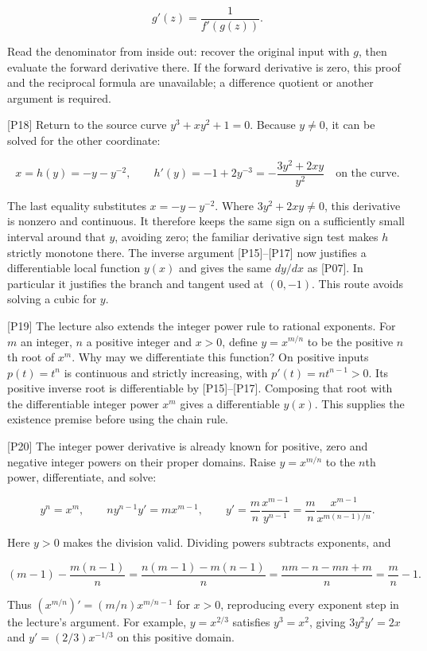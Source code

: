 \documentclass[
  11pt,
]{article}
\providecommand{\gt}{>}
\begin{document}
\[
g'(z)=\frac{1}{f'(g(z))}.
\]

Read the denominator from inside out: recover the original input with
\(g\), then evaluate the forward derivative there. If the forward
derivative is zero, this proof and the reciprocal formula are
unavailable; a difference quotient or another argument is required.

{[}P18{]} Return to the source curve \(y^3+xy^2+1=0\). Because
\(y\ne0\), it can be solved for the other coordinate:

\[
x=h(y)=-y-y^{-2},\qquad h'(y)=-1+2y^{-3}
       =-\frac{3y^2+2xy}{y^2}\quad\text{on the curve}.
\]

The last equality substitutes \(x=-y-y^{-2}\). Where \(3y^2+2xy\ne0\),
this derivative is nonzero and continuous. It therefore keeps the same
sign on a sufficiently small interval around that \(y\), avoiding zero;
the familiar derivative sign test makes \(h\) strictly monotone there.
The inverse argument {[}P15{]}--{[}P17{]} now justifies a differentiable
local function \(y(x)\) and gives the same \(dy/dx\) as {[}P07{]}. In
particular it justifies the branch and tangent used at \((0,-1)\). This
route avoids solving a cubic for \(y\).

{[}P19{]} The lecture also extends the integer power rule to rational
exponents. For \(m\) an integer, \(n\) a positive integer and
\(x\gt 0\), define \(y=x^{m/n}\) to be the positive \(n\)th root of
\(x^m\). Why may we differentiate this function? On positive inputs
\(p(t)=t^n\) is continuous and strictly increasing, with
\(p'(t)=nt^{n-1}\gt 0\). Its positive inverse root is differentiable by
{[}P15{]}--{[}P17{]}. Composing that root with the differentiable
integer power \(x^m\) gives a differentiable \(y(x)\). This supplies the
existence premise before using the chain rule.

{[}P20{]} The integer power derivative is already known for positive,
zero and negative integer powers on their proper domains. Raise
\(y=x^{m/n}\) to the \(n\)th power, differentiate, and solve:

\[
y^n=x^m,\qquad ny^{n-1}y'=mx^{m-1},\qquad
y'=\frac{m}{n}\frac{x^{m-1}}{y^{n-1}}
   =\frac{m}{n}\frac{x^{m-1}}{x^{m(n-1)/n}}.
\]

Here \(y\gt 0\) makes the division valid. Dividing powers subtracts
exponents, and

\[
(m-1)-\frac{m(n-1)}n
=\frac{n(m-1)-m(n-1)}n
=\frac{nm-n-mn+m}{n}
=\frac mn-1.
\]

Thus \((x^{m/n})'=(m/n)x^{m/n-1}\) for \(x\gt 0\), reproducing every
exponent step in the lecture's argument. For example, \(y=x^{2/3}\)
satisfies \(y^3=x^2\), giving \(3y^2y'=2x\) and \(y'=(2/3)x^{-1/3}\) on
this positive domain.
\end{document}
